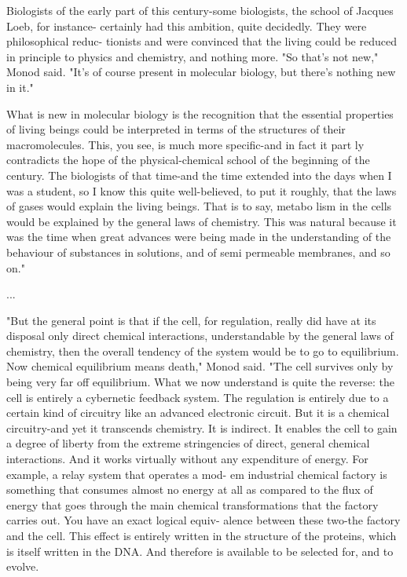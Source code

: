 \begin{longquote}
 Biologists of the early part of this century-some biologists, the school of Jacques Loeb, for instance-
certainly had this ambition, quite decidedly. They were philosophical reduc-
tionists and were convinced that the living could be reduced in principle to
physics and chemistry, and nothing more.
 "So that's not new," Monod said. "It's of course present in
molecular biology, but there's nothing new in it."

What is new in molecular biology is the recognition that the essential
properties of living beings could be interpreted in terms of the structures of
their macromolecules. This, you see, is much more specific-and in fact it part­
ly contradicts the hope of the physical-chemical school of the beginning of the
century. The biologists of that time-and the time extended into the days
when I was a student, so I know this quite well-believed, to put it roughly,
that the laws of gases would explain the living beings. That is to say, metabo­
lism in the cells would be explained by the general laws of chemistry. This
was natural because it was the time when great advances were being made in
the understanding of the behaviour of substances in solutions, and of semi­
permeable membranes, and so on."

...

"But the general point is that if the cell, for regulation, really did have at its disposal only direct chemical interactions, understandable by the general laws
of chemistry, then the overall tendency of the system would be to go to equilibrium. Now chemical equilibrium means death," Monod said. "The cell survives only by being very far off equilibrium. What we now understand is
quite the reverse: the cell is entirely a cybernetic feedback system. The regulation is entirely due to a certain kind of circuitry like an advanced electronic
circuit. But it is a chemical circuitry-and yet it transcends chemistry. It is indirect. It enables the cell to gain a degree of liberty from the extreme stringencies of direct, general chemical interactions. And it works virtually without
any expenditure of energy. For example, a relay system that operates a mod-
em industrial chemical factory is something that consumes almost no energy
at all as compared to the flux of energy that goes through the main chemical
transformations that the factory carries out. You have an exact logical equiv-
alence between these two-the factory and the cell. This effect is entirely
written in the structure of the proteins, which is itself written in the DNA.
And therefore is available to be selected for, and to evolve.
\cite{Judson1996}
\end{longquote}

